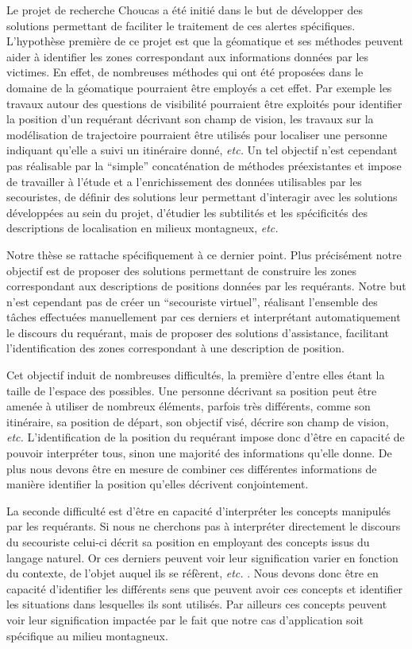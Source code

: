 Le projet de recherche Choucas a été initié dans le but de développer
des solutions permettant de faciliter le traitement de ces alertes
spécifiques. L'hypothèse première de ce projet est que la géomatique
et ses méthodes peuvent aider à identifier les zones correspondant aux
informations données par les victimes. En effet, de nombreuses
méthodes qui ont été proposées dans le domaine de la géomatique
pourraient être employés a cet effet. Par exemple les travaux autour
des questions de visibilité pourraient être exploités pour identifier
la position d'un requérant décrivant son champ de vision, les travaux
sur la modélisation de trajectoire pourraient être utilisés pour
localiser une personne indiquant qu'elle a suivi un itinéraire donné,
\emph{etc.} Un tel objectif n'est cependant pas réalisable par la
\enquote{simple} concaténation de méthodes préexistantes et impose de
travailler à l'étude et a l’enrichissement des données utilisables par
les secouristes, de définir des solutions leur permettant d’interagir
avec les solutions développées au sein du projet, d'étudier les
subtilités et les spécificités des descriptions de localisation en
milieux montagneux, \emph{etc.}

Notre thèse se rattache spécifiquement à ce dernier point. Plus
précisément notre objectif est de proposer des solutions permettant de
construire les zones correspondant aux descriptions de positions
données par les requérants. Notre but n'est cependant pas de créer un
\enquote{secouriste virtuel}, réalisant l'ensemble des tâches
effectuées manuellement par ces derniers et interprétant
automatiquement le discours du requérant, mais de proposer des
solutions d'assistance, facilitant l'identification des zones
correspondant à une description de position.

Cet objectif induit de nombreuses difficultés, la première d'entre
elles étant la taille de l'espace des possibles. Une personne
décrivant sa position peut être amenée à utiliser de nombreux
éléments, parfois très différents, comme son itinéraire, sa position
de départ, son objectif visé, décrire son champ de vision, \emph{etc.}
L'identification de la position du requérant impose donc d'être en
capacité de pouvoir interpréter tous, sinon une majorité des
informations qu'elle donne. De plus nous devons être en mesure de
combiner ces différentes informations de manière identifier la
position qu'elles décrivent conjointement.

La seconde difficulté est d'être en capacité d'interpréter les
concepts manipulés par les requérants. Si nous ne cherchons pas à
interpréter directement le discours du secouriste celui-ci décrit sa
position en employant des concepts issus du langage naturel. Or ces
derniers peuvent voir leur signification varier en fonction du
contexte, de l'objet auquel ils se réfèrent, \emph{etc.}
\autocite{Vandeloise1986}. Nous devons donc être en capacité
d'identifier les différents sens que peuvent avoir ces concepts et
identifier les situations dans lesquelles ils sont utilisés. Par
ailleurs ces concepts peuvent voir leur signification impactée par le
fait que notre cas d’application soit spécifique au milieu montagneux.

